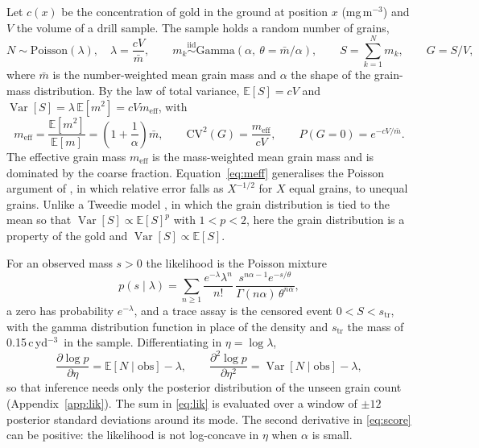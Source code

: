 \documentclass[11pt,a4paper]{article}
\theoremstyle{remark}
\newcommand{\meff}{m_{\mathrm{eff}}}
\newcommand{\mbar}{\bar m}
\newcommand{\E}{\mathbb{E}}
\newcommand{\Var}{\operatorname{Var}}
\newcommand{\cyd}{c\,yd$^{-3}$}
\begin{document}
Let $c(x)$ be the concentration of gold in the ground at position $x$ (mg\,m$^{-3}$) and $V$ the volume of a drill sample. The sample holds a random number of grains,
\begin{equation}\label{eq:cpg}
N \sim \mathrm{Poisson}(\lambda),\quad \lambda = \frac{cV}{\mbar},\qquad
m_k \overset{\mathrm{iid}}{\sim} \mathrm{Gamma}\!\left(\alpha,\ \theta = \mbar/\alpha\right),\qquad
S = \sum_{k=1}^{N} m_k,\qquad G = S/V,
\end{equation}
where $\mbar$ is the number-weighted mean grain mass and $\alpha$ the shape of the grain-mass distribution. By the law of total variance, $\E[S] = cV$ and $\Var[S] = \lambda\,\E[m^2] = cV\meff$, with
\begin{equation}\label{eq:meff}
\meff = \frac{\E[m^2]}{\E[m]} = \left(1 + \frac{1}{\alpha}\right)\mbar,
\qquad
\mathrm{CV}^2(G) = \frac{\meff}{cV},
\qquad
P(G = 0) = e^{-cV/\mbar}.
\end{equation}
The effective grain mass $\meff$ is the mass-weighted mean grain mass and is dominated by the coarse fraction. Equation~\eqref{eq:meff} generalises the Poisson argument of \citet{Clifton1969}, in which relative error falls as $X^{-1/2}$ for $X$ equal grains, to unequal grains. Unlike a Tweedie model \citep{Jorgensen1987,Dunn2005,Anderson2025}, in which the grain distribution is tied to the mean so that $\Var[S] \propto \E[S]^p$ with $1 < p < 2$, here the grain distribution is a property of the gold and $\Var[S] \propto \E[S]$.

For an observed mass $s > 0$ the likelihood is the Poisson mixture
\begin{equation}\label{eq:lik}
p(s \mid \lambda) = \sum_{n \ge 1} \frac{e^{-\lambda}\lambda^n}{n!}\,
\frac{s^{n\alpha - 1} e^{-s/\theta}}{\Gamma(n\alpha)\,\theta^{n\alpha}},
\end{equation}
a zero has probability $e^{-\lambda}$, and a trace assay is the censored event $0 < S < s_{\mathrm{tr}}$, with the gamma distribution function in place of the density and $s_{\mathrm{tr}}$ the mass of 0.15\,\cyd\ in the sample. Differentiating in $\eta = \log\lambda$,
\begin{equation}\label{eq:score}
\frac{\partial \log p}{\partial \eta} = \E[N \mid \mathrm{obs}] - \lambda,
\qquad
\frac{\partial^2 \log p}{\partial \eta^2} = \Var[N \mid \mathrm{obs}] - \lambda,
\end{equation}
so that inference needs only the posterior distribution of the unseen grain count (Appendix~\ref{app:lik}). The sum in \eqref{eq:lik} is evaluated over a window of $\pm 12$ posterior standard deviations around its mode. The second derivative in \eqref{eq:score} can be positive: the likelihood is not log-concave in $\eta$ when $\alpha$ is small.
\end{document}
